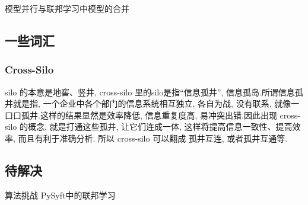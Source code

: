 \documentclass[a4paper]{article}
\theoremstyle{definition}
\numberwithin{equation}{section}
\begin{document}
模型并行与联邦学习中模型的合并

 


\subsection*{一些词汇}
\subsubsection*{ Cross-Silo} 
silo 的本意是地窖、竖井, cross-silo 里的silo是指“信息孤井”, 信息孤岛.所谓信息孤井就是指, 一个企业中各个部门的信息系统相互独立, 各自为战, 没有联系, 就像一口口孤井.这样的结果显然是效率降低, 信息重复度高, 易冲突出错.因此出现 cross-silo 的概念, 就是打通这些孤井, 让它们连成一体, 这样将提高信息一致性、提高效率, 而且有利于准确分析.
所以 cross-silo 可以翻成 孤井互连, 或者孤井互通等. 


\subsection{待解决}
算法挑战
PySyft中的联邦学习 



\end{document}
